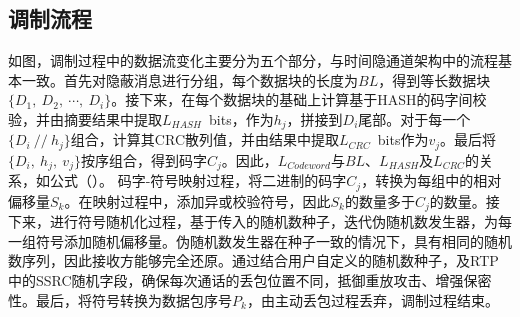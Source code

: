 \subsection{调制流程}
\label{chap:hash:designation:modulation}


如图，调制过程中的数据流变化主要分为五个部分，与时间隐通道架构中的流程基本一致。首先对隐蔽消息进行分组，每个数据块的长度为$BL$，得到等长数据块$\{D_{1},\ D_{2},\ \cdots ,\ D_{i}\}$。接下来，在每个数据块的基础上计算基于HASH的码字间校验，并由摘要结果中提取{$L_{HASH}$\ bits}，作为$h_{j}$，拼接到$D_{i}$尾部。对于每一个$\{D_{i}\ //\ h_{j}\}$组合，计算其CRC散列值，并由结果中提取{$L_{CRC}$\ bits}作为$v_{j}$。最后将$\{D_{i},\ h_{j},\ v_{j}\}$按序组合，得到码字$C_{j}$。因此，$L_{Codeword}$与$BL$、$L_{HASH}$及$L_{CRC}$的关系，如公式（）。
码字-符号映射过程，将二进制的码字$C_{j}$，转换为每组中的相对偏移量$S_{k}$。在映射过程中，添加异或校验符号，因此$S_{k}$的数量多于$C_{j}$的数量。接下来，进行符号随机化过程，基于传入的随机数种子，迭代伪随机数发生器，为每一组符号添加随机偏移量。伪随机数发生器在种子一致的情况下，具有相同的随机数序列，因此接收方能够完全还原。通过结合用户自定义的随机数种子，及RTP中的SSRC随机字段，确保每次通话的丢包位置不同，抵御重放攻击、增强保密性。最后，将符号转换为数据包序号$P_{k}$，由主动丢包过程丢弃，调制过程结束。

